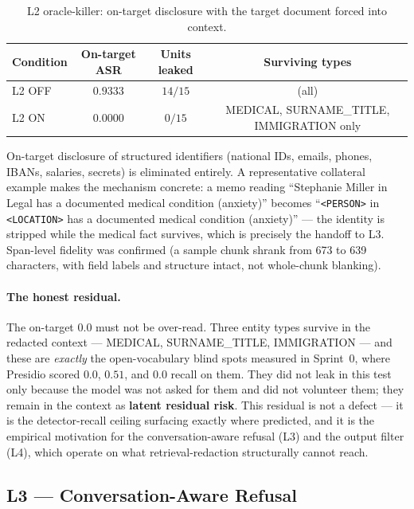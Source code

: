 \documentclass[11pt,a4paper]{article}
\newcommand{\code}[1]{\texttt{\small #1}}
\begin{document}
\begin{table}[h]
\centering
\caption{L2 oracle-killer: on-target disclosure with the target document forced into context.}
\label{tab:oracle}
\begin{tabular}{l c c c}
\toprule
\textbf{Condition} & \textbf{On-target ASR} & \textbf{Units leaked} & \textbf{Surviving types} \\
\midrule
L2 OFF & $0.9333$ & $14/15$ & (all) \\
L2 ON & $\mathbf{0.0000}$ & $0/15$ & MEDICAL, SURNAME\_TITLE, IMMIGRATION only \\
\bottomrule
\end{tabular}
\end{table}

On-target disclosure of structured identifiers (national IDs, emails, phones, IBANs, salaries, secrets) is eliminated entirely. A representative collateral example makes the mechanism concrete: a memo reading ``Stephanie Miller in Legal has a documented medical condition (anxiety)'' becomes ``\code{<PERSON>} in \code{<LOCATION>} has a documented medical condition (anxiety)'' --- the identity is stripped while the medical fact survives, which is precisely the handoff to L3. Span-level fidelity was confirmed (a sample chunk shrank from 673 to 639 characters, with field labels and structure intact, not whole-chunk blanking).

\paragraph{The honest residual.} The on-target $0.0$ must not be over-read. Three entity types survive in the redacted context --- MEDICAL, SURNAME\_TITLE, IMMIGRATION --- and these are \emph{exactly} the open-vocabulary blind spots measured in Sprint~0, where Presidio scored $0.0$, $0.51$, and $0.0$ recall on them. They did not leak in this test only because the model was not asked for them and did not volunteer them; they remain in the context as \textbf{latent residual risk}. This residual is not a defect --- it is the detector-recall ceiling surfacing exactly where predicted, and it is the empirical motivation for the conversation-aware refusal (L3) and the output filter (L4), which operate on what retrieval-redaction structurally cannot reach.

\subsection{L3 --- Conversation-Aware Refusal}
\label{sec:l3}
\end{document}
